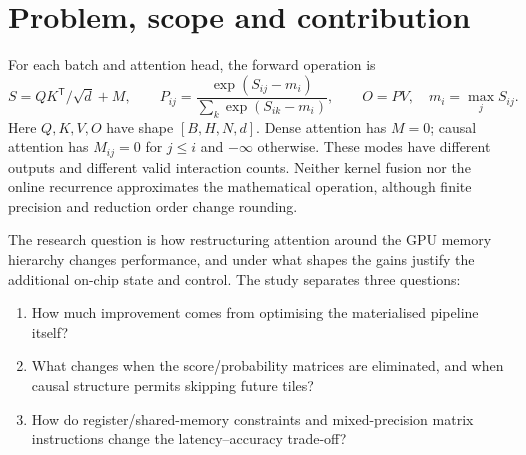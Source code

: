 \documentclass[11pt,a4paper]{article}
\begin{document}
\begin{abstract}
Conventional scaled dot-product attention writes quadratic score and probability
matrices to GPU global memory. This project studies an alternative decomposition
that computes attention tiles on chip and combines them using numerically stable
online softmax. The implementation comprises materialised dense/causal CUDA
baselines, a dense fused component to be supplied by Part B, and causal fused
CUDA-core and Tensor Core variants. The causal progression explores thread and
warp ownership, shared-memory reuse, two-dimensional register tiling, future-tile
skipping and conditional vector loads. The Tensor Core extension includes both
WMMA and explicit PTX MMA, with its probability-rounding and accumulation contract
stated separately from FP32. A shared FP64 C++ oracle, deterministic input
fingerprints, bounded configuration selection and standardized result tables make
same-machine comparisons reproducible. Evaluation distinguishes latency, explicit
allocation, measured traffic, instruction scheduling and numerical error, while
separating controlled ablations from changes that combine several mechanisms.
Final plots and findings are intentionally reserved for a fresh common-machine
experiment after Part B is integrated.
\end{abstract}
\tableofcontents
\clearpage

\section{Problem, scope and contribution}\label{sec:scope}
For each batch and attention head, the forward operation is
\begin{equation}
 S=QK^{\mathsf T}/\sqrt d+M,\qquad
 P_{ij}=\frac{\exp(S_{ij}-m_i)}{\sum_k\exp(S_{ik}-m_i)},\qquad
 O=PV,\quad m_i=\max_j S_{ij}.
 \label{eq:attention}
\end{equation}
Here $Q,K,V,O$ have shape $[B,H,N,d]$. Dense attention has $M=0$;
causal attention has $M_{ij}=0$ for $j\leq i$ and $-\infty$ otherwise.
These modes have different outputs and different valid interaction counts.
Neither kernel fusion nor the online recurrence approximates the mathematical
operation, although finite precision and reduction order change rounding.

The research question is how restructuring attention around the GPU memory
hierarchy changes performance, and under what shapes the gains justify the
additional on-chip state and control. The study separates three questions:
\begin{enumerate}[nosep,leftmargin=*]
\item How much improvement comes from optimising the materialised pipeline itself?
\item What changes when the score/probability matrices are eliminated, and when
causal structure permits skipping future tiles?
\item How do register/shared-memory constraints and mixed-precision matrix
instructions change the latency--accuracy trade-off?
\end{enumerate}
\end{document}

